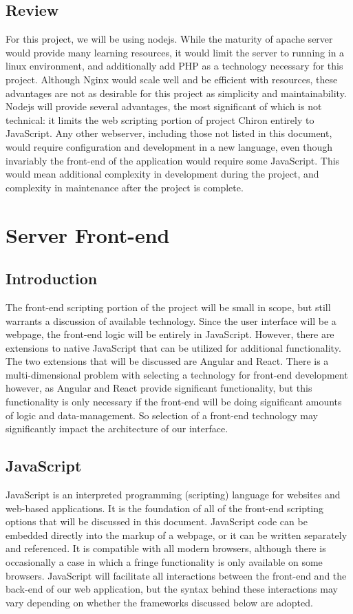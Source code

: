 \documentclass[onecolumn, draftclsnofoot,10pt, compsoc]{report}
\begin{document}
\subsection{Review}
For this project, we will be using nodejs. While the maturity of apache server would provide many learning resources,
it would limit the server to running in a linux environment, and additionally add PHP as a technology necessary for
this project. Although Nginx would scale well and be efficient with resources, these advantages are not as desirable for
this project as simplicity and maintainability. Nodejs will provide several advantages, the most significant of which is
not technical: it limits the web scripting portion of project Chiron entirely to JavaScript. Any other webserver, including
those not listed in this document, would require configuration and development in a new language, even though
invariably the front-end of the application would require some JavaScript. This would mean additional complexity in
development during the project, and complexity in maintenance after the project is complete.


\section{Server Front-end}
\subsection{Introduction}
The front-end scripting portion of the project will be small in scope, but still warrants a discussion of available
technology. Since the user interface will be a webpage, the front-end logic will be entirely in JavaScript. However,
there are extensions to native JavaScript that can be utilized for additional functionality. The two extensions that will
be discussed are Angular and React. There is a multi-dimensional problem with selecting a technology for front-end
development however, as Angular and React provide significant functionality, but this functionality is only necessary if
the front-end will be doing significant amounts of logic and data-management. So selection of a front-end technology
may significantly impact the architecture of our interface.
\subsection{JavaScript}
JavaScript is an interpreted programming (scripting) language for websites and web-based applications. It is the
foundation of all of the front-end scripting options that will be discussed in this document. JavaScript code can be
embedded directly into the markup of a webpage, or it can be written separately and referenced. It is compatible with
all modern browsers, although there is occasionally a case in which a fringe functionality is only available on some
browsers. JavaScript will facilitate all interactions between the front-end and the back-end of our web application, but
the syntax behind these interactions may vary depending on whether the frameworks discussed below are adopted.
\end{document}
